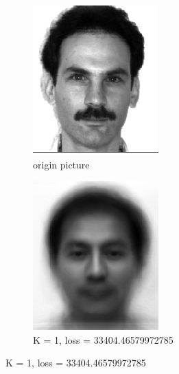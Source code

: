 \documentclass[12pt,letterpaper]{article}
\begin{document}
\begin{figure}
\captionsetup[subfigure]{labelformat=empty}
\centering
\begin{subfigure}{.5\textwidth}
  \centering
  \includegraphics[width=.4\linewidth]{ori02.png}
  \caption{origin picture}
  \label{fig:sub1}
\end{subfigure}%
\begin{subfigure}{.5\textwidth}
  \centering
  \includegraphics[width=.4\linewidth]{res021.png}
  \caption{K = 1, loss = 33404.46579972785}
  \label{fig:sub2}
\end{subfigure}
\label{fig:test}
\end{figure}
\end{document}
